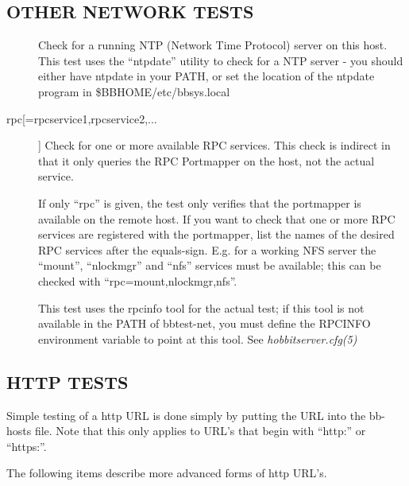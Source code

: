 \subsection{OTHER NETWORK TESTS}
\begin{description}
\item[] Check for a running NTP (Network Time Protocol) server on
  this host. This test uses the ``ntpdate'' utility to check for a NTP
  server - you should either have ntpdate in your PATH, or set the
  location of the ntpdate program in \$BBHOME/etc/bbsys.local 


\item[rpc[=rpcservice1,rpcservice2,...]] Check for one or more
  available RPC services. This check is indirect in that it only
  queries the RPC Portmapper on the host, not the actual service. 


  If only ``rpc'' is given, the test only verifies that the portmapper
  is available on the remote host. If you want to check that one or
  more RPC services are registered with the portmapper, list the names
  of the desired RPC services after the equals-sign. E.g. for a
  working NFS server the ``mount'', ``nlockmgr'' and ``nfs'' services
  must be available; this can be checked with
  ``rpc=mount,nlockmgr,nfs''. 



  This test uses the rpcinfo tool for the actual test; if this tool is
  not available in the PATH of bbtest-net, you must define the RPCINFO
  environment variable to point at this tool. See
  \emph{hobbitserver.cfg(5)}


\end{description}
\subsection{HTTP TESTS}
 Simple testing of a http URL is done simply by putting the URL into
 the bb-hosts file. Note that this only applies to URL's that begin
 with ``http:'' or ``https:''. 


  The following items describe more advanced forms of http URL's. 


